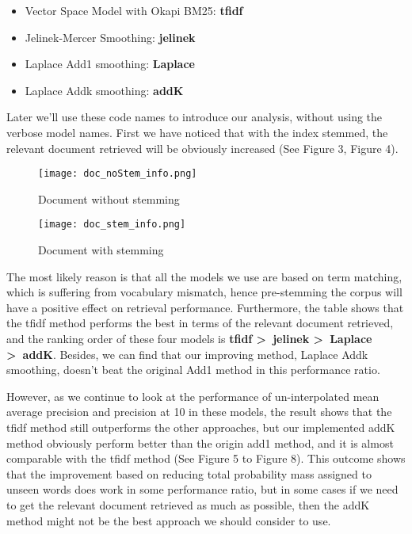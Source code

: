 \documentclass{article}
\begin{document}
\begin{itemize}
    \item Vector Space Model with Okapi BM25: \textbf{tfidf}
    \item Jelinek-Mercer Smoothing: \textbf{jelinek}
    \item Laplace Add1 smoothing: \textbf{Laplace}
    \item Laplace Addk smoothing: \textbf{addK}
\end{itemize}

Later we’ll use these code names to introduce our analysis, without using the verbose model names. First we have noticed that with the index stemmed, the relevant document retrieved will be obviously increased (See Figure 3, Figure 4).

\begin{figure}[!htp]
        \texttt{[image: doc\_noStem\_info.png]}
        \caption{Document without stemming}
    \endminipage\hfill
        \centering
        \texttt{[image: doc\_stem\_info.png]}
        \caption{Document with stemming}
    \endminipage
    
\end{figure}

The most likely reason is that all the models we use are based on term matching, which is suffering from vocabulary mismatch, hence pre-stemming the corpus will have a positive effect on retrieval performance. Furthermore, the table shows that the tfidf method performs the best in terms of the relevant document retrieved, and the ranking order of these four models is \textbf{tfidf \textgreater\ jelinek \textgreater\ Laplace \textgreater\ addK}. Besides, we can find that our improving method, Laplace Addk smoothing, doesn’t beat the original Add1 method in this performance ratio. 

However, as we continue to look at the performance of un-interpolated mean average precision and precision at 10 in these models, the result shows that the tfidf method still outperforms the other approaches, but our implemented addK method obviously perform better than the origin add1 method, and it is almost comparable with the tfidf method (See Figure 5 to Figure 8). This outcome shows that the improvement based on reducing total probability mass assigned to unseen words does work in some performance ratio, but in some cases if we need to get the
relevant document retrieved as much as possible, then the addK method might not be the best approach we should consider to use.
\end{document}
